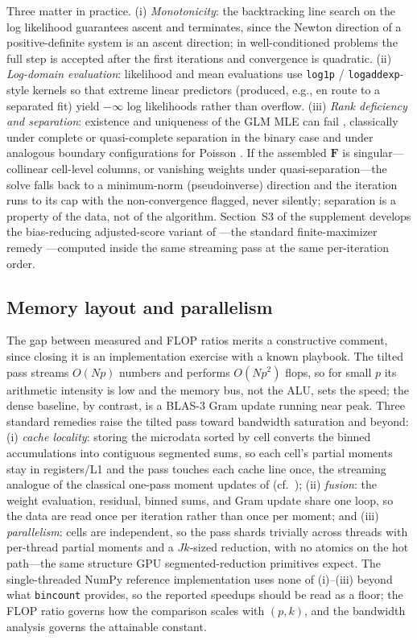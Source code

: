 \documentclass[11pt]{article}
\newcommand{\bF}{\mathbf{F}}
\begin{document}
Three matter in practice.  (i) \emph{Monotonicity}: the backtracking
line search on the log likelihood guarantees ascent and terminates,
since the Newton direction of a positive-definite system is an ascent
direction; in well-conditioned problems the full step is accepted after
the first iterations and convergence is quadratic.  (ii) \emph{Log-domain
evaluation}: likelihood and mean evaluations use \texttt{log1p} /
\texttt{logaddexp}-style kernels so that extreme linear predictors
(produced, e.g., en route to a separated fit) yield $-\infty$ log
likelihoods rather than overflow.  (iii) \emph{Rank deficiency and
separation}: existence and uniqueness of the GLM MLE can fail
\citep{wedderburn1976}, classically under complete or quasi-complete
separation in the binary case \citep{albert1984} and under analogous
boundary configurations for Poisson
\citep{santossilva2010,santossilva2011,correia2019}.  If the assembled
$\bF$ is singular---collinear cell-level columns, or vanishing weights
under quasi-separation---the solve falls back to a minimum-norm
(pseudoinverse) direction and the iteration runs to its cap with the
non-convergence flagged, never silently; separation is a property of the
data, not of the algorithm.  Section~S3 of the supplement develops the
bias-reducing adjusted-score variant of \citet{firth1993}---the standard
finite-maximizer remedy \citep{heinze2002,kosmidis2009}---computed
inside the same streaming pass at the same per-iteration order.

\subsection{Memory layout and parallelism}\label{sec:memory}

The gap between measured and FLOP ratios merits a constructive comment,
since closing it is an implementation exercise with a known playbook.
The tilted pass streams $O(Np)$ numbers and performs $O(Np^2)$ flops, so
for small $p$ its arithmetic intensity is low and the memory bus, not
the ALU, sets the speed; the dense baseline, by contrast, is a BLAS-3
Gram update running near peak.  Three standard remedies raise the tilted
pass toward bandwidth saturation and beyond: (i) \emph{cache locality}:
storing the microdata sorted by cell converts the binned accumulations
into contiguous segmented sums, so each cell's partial moments stay in
registers/L1 and the pass touches each cache line once, the streaming
analogue of the classical one-pass moment updates of \citet{welford1962}
(cf.\ \citealp{correia2016}); (ii) \emph{fusion}: the weight evaluation,
residual, binned sums, and Gram update share one loop, so the data are
read once per iteration rather than once per moment; and (iii)
\emph{parallelism}: cells are independent, so the pass shards trivially
across threads with per-thread partial moments and a $J k$-sized
reduction, with no atomics on the hot path---the same structure GPU
segmented-reduction primitives expect.  The single-threaded NumPy
reference implementation uses none of (i)--(iii) beyond what
\texttt{bincount} provides, so the reported speedups should be read as a
floor; the FLOP ratio governs how the comparison scales with $(p, k)$,
and the bandwidth analysis governs the attainable constant.
\end{document}
